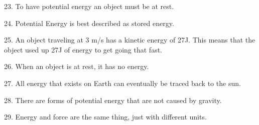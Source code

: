 \documentclass[12pt]{examdesign}
\begin{document}
\begin{truefalse} [title={True or False},
	rearrange=no]
		\begin{question}
			 23. To have potential energy an object must be at rest.
		\end{question}
		\begin{question}
			 24. Potential Energy is best described as stored energy.
		\end{question}
		\begin{question}
			 25. An object traveling at 3 m/s has a kinetic energy of 27J.  This means that the object used up 27J of energy to get going that fast. 
		\end{question}
		
		
		\begin{question}
			 26. When an object is at rest, it has no energy.
		\end{question}
		
		
		\begin{question}
			 27. All energy that exists on Earth can eventually be traced back to the sun.
		\end{question}
		
		\begin{question}
			 28. There are forms of potential energy that are not caused by gravity.
		\end{question}
		
			\begin{question}
			 29. Energy and force are the same thing, just with different units.
		\end{question}
		

		
		
		
		
		
		


\end{truefalse}
\end{document}
